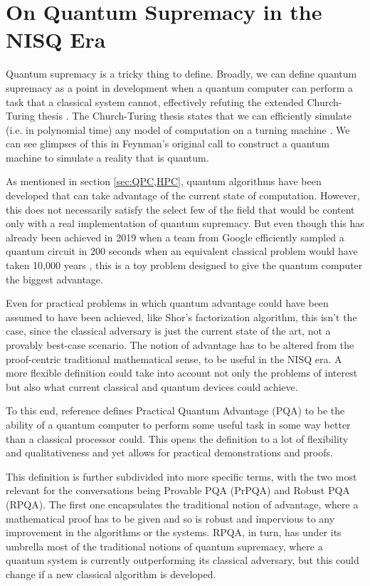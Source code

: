 \chapter{On Quantum Supremacy in the NISQ Era} \label{app:QuantumSip}

Quantum supremacy is a tricky thing to define. Broadly, we can define quantum supremacy as a point in development when a quantum computer can perform a task that a classical system cannot, effectively refuting the extended Church-Turing thesis \cite{harrow_quantum_2017}. The Church-Turing thesis states that we can efficiently simulate (i.e. in polynomial time) any model of computation on a turning machine  \cite{kliesch_dissipative_2011}. We can see glimpses of this in Feynman's original call to construct a quantum machine to simulate a reality that is quantum.

As mentioned in section \ref{sec:QPC,HPC}, quantum algorithms have been developed that can take advantage of the current state of computation. However, this does not necessarily satisfy the select few of the field that would be content only with a real implementation of quantum supremacy. But even though this has already been achieved in 2019 when a team from Google efficiently sampled a quantum circuit in 200 seconds when an equivalent classical problem would have taken 10,000 years \cite{arute_quantum_2019}, this is a toy problem designed to give the quantum computer the biggest advantage.

Even for practical problems in which quantum advantage could have been assumed to have been achieved, like Shor's factorization algorithm, this isn't the case, since the classical adversary is just the current state of the art, not a provably best-case scenario. The notion of advantage has to be altered from the proof-centric traditional mathematical sense, to be useful in the NISQ era. A more flexible definition could take into account not only the problems of interest but also what current classical and quantum devices could achieve.

To this end, reference \cite{hibat-allah_framework_2024} defines Practical Quantum Advantage (PQA) to be the ability of a quantum computer to perform some useful task in some way better than a classical processor could. This opens the definition to a lot of flexibility and qualitativeness and yet allows for practical demonstrations and proofs.

This definition is further subdivided into more specific terms, with the two most relevant for the conversations being Provable PQA (PrPQA) and Robust PQA (RPQA). The first one encapsulates the traditional notion of advantage, where a mathematical proof has to be given and so is robust and impervious to any improvement in the algorithms or the systems. RPQA, in turn, has under its umbrella most of the traditional notions of quantum supremacy, where a quantum system is currently outperforming its classical adversary, but this could change if a new classical algorithm is developed.

